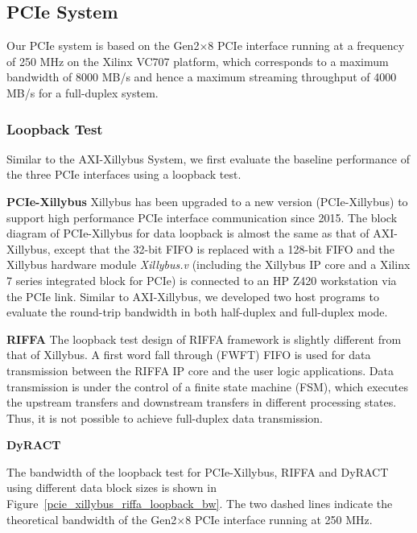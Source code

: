 \subsection{PCIe System}
Our PCIe system is based on the Gen2$\times$8 PCIe interface running at a frequency of 250 MHz on the Xilinx VC707 platform, which corresponds to a maximum bandwidth of 8000 MB/s and hence a maximum streaming throughput of 4000 MB/s for a full-duplex system. 


\subsubsection{Loopback Test}
Similar to the AXI-Xillybus System, we first evaluate the baseline performance of the three PCIe interfaces using a loopback test. 

\noindent \textbf{PCIe-Xillybus}
Xillybus has been upgraded to a new version (PCIe-Xillybus) to support high performance PCIe interface communication since 2015. 
The block diagram of PCIe-Xillybus for data loopback is almost the same as that of AXI-Xillybus, except that the 32-bit FIFO is replaced with a 128-bit FIFO and the Xillybus hardware module \textit{Xillybus.v} (including the Xillybus IP core and a Xilinx 7 series integrated block for PCIe) is connected to an HP Z420 workstation via the PCIe link. 
Similar to AXI-Xillybus, we developed two host programs to evaluate the round-trip bandwidth in both half-duplex and full-duplex mode. 

\noindent \textbf{RIFFA}
The loopback test design of RIFFA framework is slightly different from that of Xillybus. 
A first word fall through (FWFT) FIFO is used for data transmission between the RIFFA IP core and the user logic applications. 
Data transmission is under the control of a finite state machine (FSM), which executes the upstream transfers and downstream transfers in different processing states.  
Thus, it is not possible to achieve full-duplex data transmission. 

\noindent \textbf{DyRACT}


The bandwidth of the loopback test for PCIe-Xillybus, RIFFA and DyRACT using different data block sizes is shown in Figure~\ref{pcie_xillybus_riffa_loopback_bw}. 
The two dashed lines indicate the theoretical bandwidth of the Gen2$\times$8 PCIe interface running at 250 MHz.




